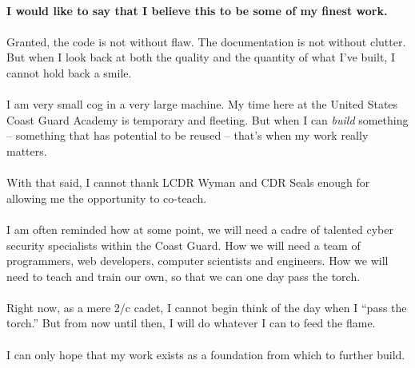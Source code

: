 \documentclass[11pt]{article}
\begin{document}
	\paragraph{} \textbf{I would like to say that I believe this to be some of my finest work.}

	\paragraph{} Granted, the code is not without flaw. The documentation is not without clutter. But when I look back at both the quality and the quantity of what I've built, I cannot hold back a smile.

	\paragraph{} I am very small cog in a very large machine. My time here at the United States Coast Guard Academy is temporary and fleeting. But when I can \textit{build} something --  something that has potential to be reused -- that's when my work really matters.

	\paragraph{} With that said, I cannot thank LCDR Wyman and CDR Seals enough for allowing me the opportunity to co-teach.  

	\paragraph{} I am often reminded how at some point, we will need a cadre of talented cyber security specialists within the Coast Guard. How we will need a team of programmers, web developers, computer scientists and engineers. How we will need to teach and train our own, so that we can one day pass the torch. 

	\paragraph{} Right now, as a mere 2/c cadet, I cannot begin think of the day when I ``pass the torch.'' But from now until then, I will do whatever I can to feed the flame.

	\paragraph{} 

	\paragraph{} I can only hope that my work exists as a foundation from which to further build. 
\end{document}
